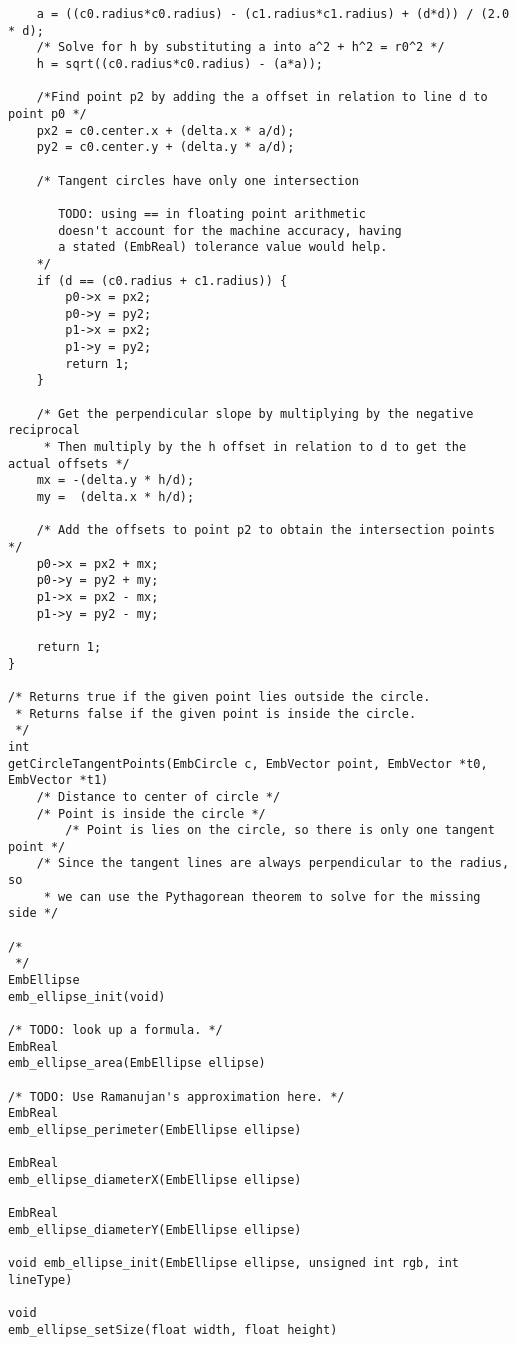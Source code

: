 \begin{lstlisting}
    a = ((c0.radius*c0.radius) - (c1.radius*c1.radius) + (d*d)) / (2.0 * d);
    /* Solve for h by substituting a into a^2 + h^2 = r0^2 */
    h = sqrt((c0.radius*c0.radius) - (a*a));

    /*Find point p2 by adding the a offset in relation to line d to point p0 */
    px2 = c0.center.x + (delta.x * a/d);
    py2 = c0.center.y + (delta.y * a/d);

    /* Tangent circles have only one intersection

       TODO: using == in floating point arithmetic
       doesn't account for the machine accuracy, having
       a stated (EmbReal) tolerance value would help.
    */
    if (d == (c0.radius + c1.radius)) {
        p0->x = px2;
        p0->y = py2;
        p1->x = px2;
        p1->y = py2;
        return 1;
    }

    /* Get the perpendicular slope by multiplying by the negative reciprocal
     * Then multiply by the h offset in relation to d to get the actual offsets */
    mx = -(delta.y * h/d);
    my =  (delta.x * h/d);

    /* Add the offsets to point p2 to obtain the intersection points */
    p0->x = px2 + mx;
    p0->y = py2 + my;
    p1->x = px2 - mx;
    p1->y = py2 - my;

    return 1;
}

/* Returns true if the given point lies outside the circle.
 * Returns false if the given point is inside the circle.
 */
int
getCircleTangentPoints(EmbCircle c, EmbVector point, EmbVector *t0, EmbVector *t1)
    /* Distance to center of circle */
    /* Point is inside the circle */
        /* Point is lies on the circle, so there is only one tangent point */
    /* Since the tangent lines are always perpendicular to the radius, so
     * we can use the Pythagorean theorem to solve for the missing side */

/*
 */
EmbEllipse
emb_ellipse_init(void)

/* TODO: look up a formula. */
EmbReal
emb_ellipse_area(EmbEllipse ellipse)

/* TODO: Use Ramanujan's approximation here. */
EmbReal
emb_ellipse_perimeter(EmbEllipse ellipse)

EmbReal
emb_ellipse_diameterX(EmbEllipse ellipse)

EmbReal
emb_ellipse_diameterY(EmbEllipse ellipse)

void emb_ellipse_init(EmbEllipse ellipse, unsigned int rgb, int lineType)

void
emb_ellipse_setSize(float width, float height)


\end{lstlisting}
